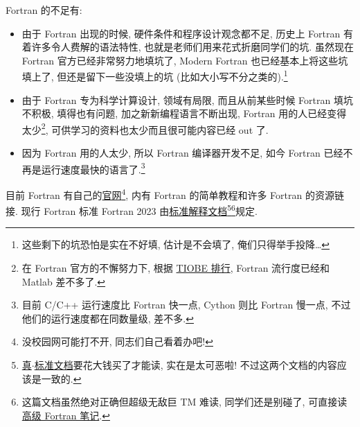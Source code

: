 Fortran 的不足有:
\begin{itemize}
    \item 由于 Fortran 出现的时候, 硬件条件和程序设计观念都不足, 历史上 Fortran 有着许多令人费解的语法特性, 也就是老师们用来花式折磨同学们的坑. 虽然现在 Fortran 官方已经非常努力地填坑了, Modern Fortran 也已经基本上将这些坑填上了, 但还是留下一些没填上的坑 (比如大小写不分之类的).\footnote{这些剩下的坑恐怕是实在不好填, 估计是不会填了, 俺们只得举手投降\dots{}}
    \item 由于 Fortran 专为科学计算设计, 领域有局限, 而且从前某些时候 Fortran 填坑不积极, 填得也有问题, 加之新新编程语言不断出现, Fortran 用的人已经变得太少\footnote{在 Fortran 官方的不懈努力下, 根据 \href{https://www.tiobe.com/tiobe-index/}{TIOBE 排行}, Fortran 流行度已经和 Matlab 差不多了.}, 可供学习的资料也太少而且很可能内容已经 out 了.
    \item 因为 Fortran 用的人太少, 所以 Fortran 编译器开发不足, 如今 Fortran 已经不再是运行速度最快的语言了.\footnote{目前 C/C++ 运行速度比 Fortran 快一点, Cython 则比 Fortran 慢一点, 不过他们的运行速度都在同数量级, 差不多.}
\end{itemize}

目前 Fortran 有自己的\href{https://fortran-lang.org/}{官网}\footnote{没校园网可能打不开, 同志们自己看着办吧!}, 内有 Fortran 的简单教程和许多 Fortran 的资源链接. 现行 Fortran 标准 Fortran 2023 由\href{https://j3-fortran.org/doc/year/24/24-007.pdf}{标准解释文档}\footnote{\href{https://www.iso.org/standard/82170.html}{真$\cdot$标准文档}要花大钱买了才能读, 实在是太可恶啦! 不过这两个文档的内容应该是一致的.}\footnote{这篇文档虽然绝对正确但超级无敌巨 TM 难读, 同学们还是别碰了, 可直接读\href{https://github.com/GasinAn/AdvForNotes}{高级 Fortran 笔记}.}规定.
